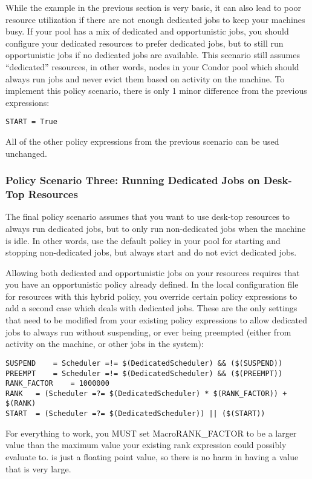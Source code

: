 While the example in the previous section is very basic, it can also
lead to poor resource utilization if there are not enough dedicated
jobs to keep your machines busy.  
If your pool has a mix of dedicated and opportunistic jobs, you should
configure your dedicated resources to prefer dedicated jobs, but to
still run opportunistic jobs if no dedicated jobs are available.
This scenario still assumes ``dedicated'' resources, in other words,
nodes in your Condor pool which should always run jobs and never
evict them based on activity on the machine.
To implement this policy scenario, there is only 1 minor difference
from the previous expressions:

\begin{verbatim}
START = True
\end{verbatim}

All of the other policy expressions from the previous scenario can be
used unchanged.


\subsubsection{\label{sec:Configure-Dedicated-Opportunistic-Policy}
Policy Scenario Three: Running Dedicated Jobs on Desk-Top Resources}

The final policy scenario assumes that you want to use desk-top
resources to always run dedicated jobs, but to only run non-dedicated
jobs when the machine is idle.
In other words, use the default policy in your pool for starting and
stopping non-dedicated jobs, but always start and do not evict
dedicated jobs.

Allowing both dedicated and opportunistic jobs on your resources
requires that you have an opportunistic policy already defined.
In the local configuration file for resources with this hybrid policy,
you override certain policy expressions to add a second case which
deals with dedicated jobs.
These are the only settings that need to be modified from your
existing policy expressions to allow dedicated jobs to always run
without suspending, or ever being preempted (either from activity on
the machine, or other jobs in the system):

\begin{verbatim}
SUSPEND    = Scheduler =!= $(DedicatedScheduler) && ($(SUSPEND))
PREEMPT    = Scheduler =!= $(DedicatedScheduler) && ($(PREEMPT))
RANK_FACTOR    = 1000000
RANK   = (Scheduler =?= $(DedicatedScheduler) * $(RANK_FACTOR)) + $(RANK)
START  = (Scheduler =?= $(DedicatedScheduler)) || ($(START))
\end{verbatim}

\Note For everything to work, you MUST set Macro{RANK\_FACTOR} to be a
larger value than the maximum value your existing rank expression
could possibly evaluate to.
 is just a floating point value, so there is no harm in
having a value that is very large. 

